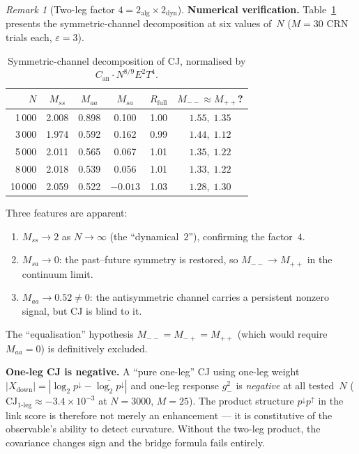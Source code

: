 \documentclass[12pt,a4paper]{article}
\theoremstyle{plain}
\theoremstyle{definition}
\theoremstyle{remark}
\newtheorem{remark}[theorem]{Remark}
\newcommand{\CJ}{\mathrm{CJ}}
\begin{document}
\begin{remark}[Two-leg factor $4 = 2_{\mathrm{alg}} \times 2_{\mathrm{dyn}}$]
\medskip\noindent\textbf{Numerical verification.}\enspace
Table~\ref{tab:symmetric} presents the symmetric-channel decomposition
at six values of~$N$ ($M = 30$ CRN trials each, $\varepsilon = 3$).
\begin{table}[ht]
\centering
\caption{Symmetric-channel decomposition of CJ, normalised by
$C_{\mathrm{an}} \cdot N^{8/9} E^2 T^4$.}
\label{tab:symmetric}
\begin{tabular}{rccccc}
\toprule
$N$ & $M_{ss}$ & $M_{aa}$ & $M_{sa}$ & $R_{\mathrm{full}}$ & $M_{--} \approx M_{++}$? \\
\midrule
1\,000  & 2.008 & 0.898 & 0.100  & 1.00 & $1.55,\; 1.35$ \\
3\,000  & 1.974 & 0.592 & 0.162  & 0.99 & $1.44,\; 1.12$ \\
5\,000  & 2.011 & 0.565 & 0.067  & 1.01 & $1.35,\; 1.22$ \\
8\,000  & 2.018 & 0.539 & 0.056  & 1.01 & $1.33,\; 1.22$ \\
10\,000 & 2.059 & 0.522 & $-0.013$ & 1.03 & $1.28,\; 1.30$ \\
\bottomrule
\end{tabular}
\end{table}

Three features are apparent:
\begin{enumerate}[label=(\roman*)]
\item $M_{ss} \to 2$ as $N \to \infty$ (the ``dynamical~$2$''),
  confirming the factor~$4$.
\item $M_{sa} \to 0$: the past--future symmetry is restored, so
  $M_{--} \to M_{++}$ in the continuum limit.
\item $M_{aa} \to 0.52 \neq 0$: the antisymmetric channel carries
  a persistent nonzero signal, but CJ is blind to it.
\end{enumerate}
The ``equalisation'' hypothesis $M_{--} = M_{-+} = M_{++}$
(which would require $M_{aa} = 0$) is definitively excluded.

\medskip\noindent\textbf{One-leg CJ is negative.}\enspace
A ``pure one-leg'' CJ using one-leg weight
$|X_{\mathrm{down}}| = |\log_2 p^{\downarrow}
- \overline{\log_2 p^{\downarrow}}|$ and one-leg response
$g_-^2$ is \emph{negative} at all tested~$N$
($\CJ_{\text{1-leg}} \approx -3.4 \times 10^{-3}$ at
$N = 3000$, $M = 25$).  The product structure
$p^{\downarrow} p^{\uparrow}$ in the link score is therefore
not merely an enhancement --- it is constitutive of the
observable's ability to detect curvature.  Without the two-leg
product, the covariance changes sign and the bridge formula
fails entirely.


\end{remark}
\end{document}
